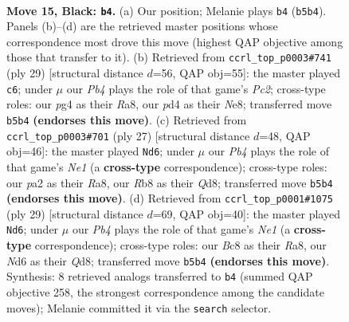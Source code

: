 \documentclass[11pt]{article}
\begin{document}
\clearpage

\begin{figure}[p]\centering
\begin{subfigure}{0.46\textwidth}\centering
\resizebox{\linewidth}{!}{%
\newchessgame
\chessboard[
  setfen={1rb2qk1/p1pp1ppp/3n1b2/1p6/3P2P1/NP6/P1P2P1P/1RBQ1BK1 b - - 4 15},
  showmover=false,
  pgfstyle=straightmove, color=movearrow, markmove={b5-b4}
]}
\caption{}
\end{subfigure}\hfill
\begin{subfigure}{0.46\textwidth}\centering
\resizebox{\linewidth}{!}{%
\newchessgame
\chessboard[
  setfen={r2qn1k1/ppp2ppp/5b2/3p1b2/3P1B2/2P4P/PP1N1PP1/R3QBK1 b - - 0 15},
  showmover=false,
  pgfstyle=straightmove, color=movearrow, markmove={c7-c6}
]}
\caption{}
\end{subfigure}
\\[4pt]
\begin{subfigure}{0.46\textwidth}\centering
\resizebox{\linewidth}{!}{%
\newchessgame
\chessboard[
  setfen={r1bqn1k1/ppp2ppp/5b2/3p4/3P1B2/2P5/PP1N1PPP/R3QBK1 b - - 1 14},
  showmover=false,
  pgfstyle=straightmove, color=movearrow, markmove={e8-d6}
]}
\caption{}
\end{subfigure}\hfill
\begin{subfigure}{0.46\textwidth}\centering
\resizebox{\linewidth}{!}{%
\newchessgame
\chessboard[
  setfen={r2qn1k1/ppp2ppp/5b2/3p1b2/3P1B2/2P1Q3/PP1N1PPP/R4BK1 b - - 3 15},
  showmover=false,
  pgfstyle=straightmove, color=movearrow, markmove={e8-d6}
]}
\caption{}
\end{subfigure}
\caption{\textbf{Move 15, Black: \texttt{b4}.} (a) Our position; Melanie plays \texttt{b4} (\texttt{b5b4}). Panels (b)--(d) are the retrieved master positions whose correspondence most drove this move (highest QAP objective among those that transfer to it). (b) Retrieved from \texttt{ccrl\_top\_p0003\#741} (ply 29) [structural distance $d$=56, QAP obj=55]: the master played \texttt{c6}; under $\mu$ our \emph{Pb4} plays the role of that game's \emph{Pc2}; cross-type roles: our \emph{p}g4 as their \emph{R}a8, our \emph{p}d4 as their \emph{N}e8; transferred move \texttt{b5b4} \textbf{(endorses this move)}. (c) Retrieved from \texttt{ccrl\_top\_p0003\#701} (ply 27) [structural distance $d$=48, QAP obj=46]: the master played \texttt{Nd6}; under $\mu$ our \emph{Pb4} plays the role of that game's \emph{Ne1} (a \textbf{cross-type} correspondence); cross-type roles: our \emph{p}a2 as their \emph{R}a8, our \emph{R}b8 as their \emph{Q}d8; transferred move \texttt{b5b4} \textbf{(endorses this move)}. (d) Retrieved from \texttt{ccrl\_top\_p0001\#1075} (ply 29) [structural distance $d$=69, QAP obj=40]: the master played \texttt{Nd6}; under $\mu$ our \emph{Pb4} plays the role of that game's \emph{Ne1} (a \textbf{cross-type} correspondence); cross-type roles: our \emph{B}c8 as their \emph{R}a8, our \emph{N}d6 as their \emph{Q}d8; transferred move \texttt{b5b4} \textbf{(endorses this move)}. Synthesis: 8 retrieved analogs transferred to \texttt{b4} (summed QAP objective 258, the strongest correspondence among the candidate moves); Melanie committed it via the \texttt{search} selector.}
\label{fig:thought-m29}
\end{figure}
\end{document}
